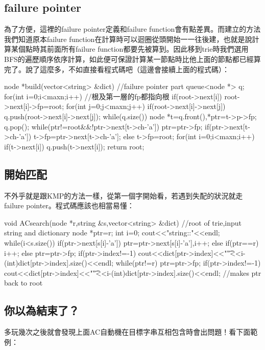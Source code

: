 \subsection{failure pointer}
為了方便，這裡的failure pointer定義和failure function會有點差異。而建立的方法我們知道原本failure function在計算時可以迴圈從頭開始一一往後建，也就是說計算某個點時其前面所有failure function都要先被算到。因此移到trie時我們選用BFS的遍歷順序依序計算，如此便可保證計算某一節點時比他上面的節點都已經算完了。說了這麼多，不如直接看程式碼吧（這邊會接續上面的程式碼）：
\begin{C++}
node *build(vector<string> &dict){
    //failure pointer part
    queue<node *> q;
    for(int i=0;i<maxn;i++){ //根及第一層的fp都指向根
        if(root->next[i]){
            root->next[i]->fp=root;
            for(int j=0;j<maxn;j++)
                if(root->next[i]->next[j])
                    q.push(root->next[i]->next[j]);
        }
    }
    while(q.size()){
        node *t=q.front(),*ptr=t->p->fp; q.pop();
        while(ptr!=root&&!ptr->next[t->ch-'a'])
            ptr=ptr->fp;
        if(ptr->next[t->ch-'a']) t->fp=ptr->next[t->ch-'a'];
        else t->fp=root;
        for(int i=0;i<maxn;i++) if(t->next[i]) q.push(t->next[i]);
    }
    return root;
}
\end{C++}
\subsection{開始匹配}
不外乎就是跟KMP的方法一樣，從第一個字開始看，若遇到失配的狀況就走failure pointer。程式碼應該也相當易懂：
\begin{C++}
void ACsearch(node *r,string &s,vector<string> &dict){
    //root of trie,input string and dictionary
    node *ptr=r;
    int i=0;
    cout<<"string:\tposition:"<<endl;
    while(i<s.size()){
        if(ptr->next[s[i]-'a'])
            ptr=ptr->next[s[i]-'a'],i++;
        else if(ptr==r)
            i++;
        else
            ptr=ptr->fp;
        if(ptr->index!=-1)
            cout<<dict[ptr->index]<<"\t"<<i-(int)dict[ptr->index].size()<<endl;
    }
    while(ptr!=r){
        ptr=ptr->fp;
        if(ptr->index!=-1)
        	cout<<dict[ptr->index]<<"\t"<<i-(int)dict[ptr->index].size()<<endl;
    } //makes ptr back to root
}
\end{C++}
\subsection{你以為結束了？}
多玩幾次之後就會發現上面AC自動機在目標字串互相包含時會出問題！看下面範例：\\


